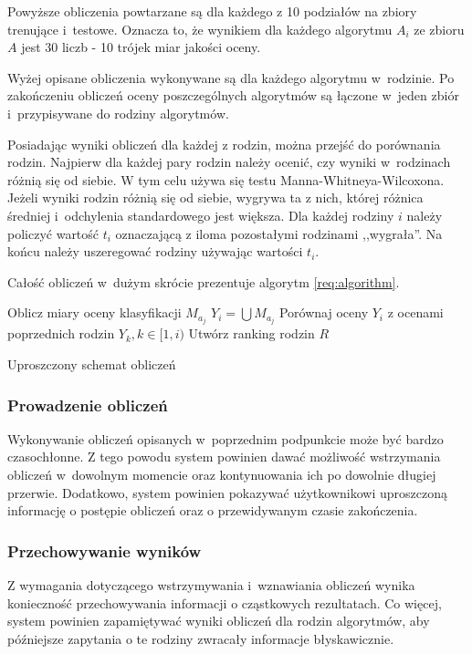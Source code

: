 \documentclass[../thesis.tex]{subfiles}
\begin{document}
Powyższe obliczenia powtarzane są dla każdego z 10 podziałów na zbiory trenujące i~testowe. Oznacza to, że wynikiem dla każdego algorytmu $A_i$ ze zbioru $A$ jest 30 liczb - 10 trójek miar jakości oceny. 

Wyżej opisane obliczenia wykonywane są dla każdego algorytmu w~rodzinie. Po zakończeniu obliczeń oceny poszczególnych algorytmów są łączone w~jeden zbiór i~przypisywane do rodziny algorytmów.

Posiadając wyniki obliczeń dla każdej z rodzin, można przejść do porównania rodzin. Najpierw dla każdej pary rodzin należy ocenić, czy wyniki w~rodzinach różnią się od siebie. W tym celu używa się testu Manna-Whitneya-Wilcoxona. Jeżeli wyniki rodzin różnią się od siebie, wygrywa ta z nich, której różnica średniej i~odchylenia standardowego jest większa. Dla każdej rodziny $i$ należy policzyć wartość $t_i$ oznaczającą z iloma pozostałymi rodzinami ,,wygrała''. Na końcu należy uszeregować rodziny używając wartości $t_i$.

Całość obliczeń w~dużym skrócie prezentuje algorytm \ref{req:algorithm}.

\begin{algorithm}[ht]
   {
     {
      Oblicz miary oceny klasyfikacji $M_{a_j}$\;
    }
    $Y_i = \bigcup M_{a_j}$\;
    Porównaj oceny $Y_i$ z ocenami poprzednich rodzin $Y_k, k \in [1, i)$\;
  }
  Utwórz ranking rodzin $R$\;
  \caption{Uproszczony schemat obliczeń}
  \label{req:algorithm}
\end{algorithm}

\subsubsection{Prowadzenie obliczeń}

Wykonywanie obliczeń opisanych w~poprzednim podpunkcie może być bardzo czasochłonne. Z tego powodu system powinien dawać możliwość wstrzymania obliczeń w~dowolnym momencie oraz kontynuowania ich po dowolnie długiej przerwie. Dodatkowo, system powinien pokazywać użytkownikowi uproszczoną informację o postępie obliczeń oraz o przewidywanym czasie zakończenia.

\subsubsection{Przechowywanie wyników}

Z wymagania dotyczącego wstrzymywania i~wznawiania obliczeń wynika konieczność przechowywania informacji o cząstkowych rezultatach. Co więcej, system powinien zapamiętywać wyniki obliczeń dla rodzin algorytmów, aby późniejsze zapytania o te rodziny zwracały informacje błyskawicznie.
\end{document}
